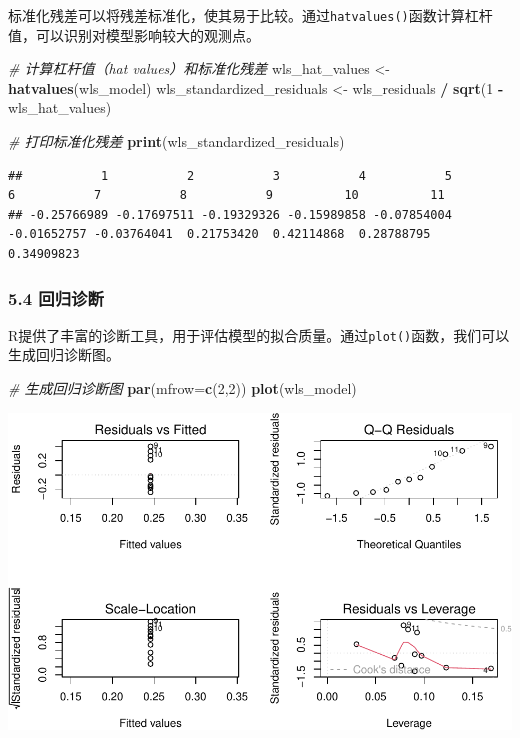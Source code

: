 \documentclass[
  10pt,
]{ctexart}
\newenvironment{Shaded}{\begin{snugshade}}{\end{snugshade}}
\newcommand{\AttributeTok}[1]{\textcolor[rgb]{0.13,0.29,0.53}{#1}}
\newcommand{\CommentTok}[1]{\textcolor[rgb]{0.56,0.35,0.01}{\textit{#1}}}
\newcommand{\DecValTok}[1]{\textcolor[rgb]{0.00,0.00,0.81}{#1}}
\newcommand{\FunctionTok}[1]{\textcolor[rgb]{0.13,0.29,0.53}{\textbf{#1}}}
\newcommand{\NormalTok}[1]{#1}
\newcommand{\OtherTok}[1]{\textcolor[rgb]{0.56,0.35,0.01}{#1}}
\newcommand{\SpecialCharTok}[1]{\textcolor[rgb]{0.81,0.36,0.00}{\textbf{#1}}}
\begin{document}
标准化残差可以将残差标准化，使其易于比较。通过\texttt{hatvalues()}函数计算杠杆值，可以识别对模型影响较大的观测点。

\begin{Shaded}
\begin{Highlighting}[]
\CommentTok{\# 计算杠杆值（hat values）和标准化残差}
\NormalTok{wls\_hat\_values }\OtherTok{\textless{}{-}} \FunctionTok{hatvalues}\NormalTok{(wls\_model)}
\NormalTok{wls\_standardized\_residuals }\OtherTok{\textless{}{-}}\NormalTok{ wls\_residuals }\SpecialCharTok{/} \FunctionTok{sqrt}\NormalTok{(}\DecValTok{1} \SpecialCharTok{{-}}\NormalTok{ wls\_hat\_values)}

\CommentTok{\# 打印标准化残差}
\FunctionTok{print}\NormalTok{(wls\_standardized\_residuals)}
\end{Highlighting}
\end{Shaded}

\begin{verbatim}
##           1           2           3           4           5           6           7           8           9          10          11 
## -0.25766989 -0.17697511 -0.19329326 -0.15989858 -0.07854004 -0.01652757 -0.03764041  0.21753420  0.42114868  0.28788795  0.34909823
\end{verbatim}

\hypertarget{ux56deux5f52ux8bcaux65ad}{%
\subsubsection{5.4 回归诊断}\label{ux56deux5f52ux8bcaux65ad}}

R提供了丰富的诊断工具，用于评估模型的拟合质量。通过\texttt{plot()}函数，我们可以生成回归诊断图。

\begin{Shaded}
\begin{Highlighting}[]
\CommentTok{\# 生成回归诊断图}
\FunctionTok{par}\NormalTok{(}\AttributeTok{mfrow=}\FunctionTok{c}\NormalTok{(}\DecValTok{2}\NormalTok{,}\DecValTok{2}\NormalTok{))}
\FunctionTok{plot}\NormalTok{(wls\_model)}
\end{Highlighting}
\end{Shaded}

\includegraphics{未命名_files/figure-latex/unnamed-chunk-7-1.pdf}
\end{document}
